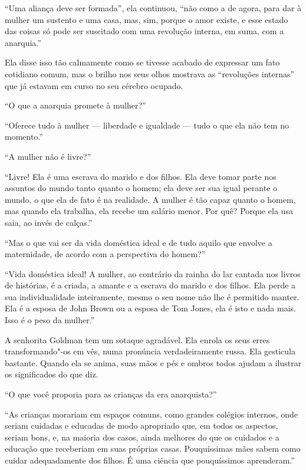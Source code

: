 ``Uma aliança deve ser formada'', ela continuou, ``não como a de agora,
para dar à mulher um sustento e uma casa, mas, sim, porque o amor
existe, e esse estado das coisas só pode ser suscitado com uma revolução
interna, em suma, com a anarquia.''

Ela disse isso tão calmamente como se tivesse acabado de expressar um
fato cotidiano comum, mas o brilho nos seus olhos mostrava as
``revoluções internas'' que já estavam em curso no seu cérebro ocupado.

``O que a anarquia promete à mulher?''

``Oferece tudo à mulher --- liberdade e igualdade --- tudo o que ela não
tem no momento.''

``A mulher não é livre?''

``Livre! Ela é uma escrava do marido e dos filhos. Ela deve tomar parte
nos assuntos do mundo tanto quanto o homem; ela deve ser sua igual
perante o mundo, o que ela de fato é na realidade. A mulher é tão capaz
quanto o homem, mas quando ela trabalha, ela recebe um salário menor.
Por quê? Porque ela usa saia, ao invés de calças.''

``Mas o que vai ser da vida doméstica ideal e de tudo aquilo que envolve
a maternidade, de acordo com a perspectiva do homem?''

``Vida doméstica ideal! A mulher, ao contrário da rainha do lar cantada
nos livros de histórias, é a criada, a amante e a escrava do marido e dos
filhos. Ela perde a sua individualidade inteiramente, mesmo o seu nome
não lhe é permitido manter. Ela é a esposa de John Brown ou a esposa de
Tom Jones, ela é isto e nada mais. Isso é o peso da mulher.'' 

A senhorita Goldman tem um sotaque agradável. Ela enrola os seus erres
transformando"-os em vês, numa pronúncia verdadeiramente russa. Ela
gesticula bastante. Quando ela se anima, suas mãos e pés e ombros todos
ajudam a ilustrar os significados do que diz.

``O que você proporia para as crianças da era anarquista?''

``As crianças morariam em espaços comuns, como grandes colégios
internos, onde seriam cuidadas e educadas de modo apropriado que, em
todos os aspectos, seriam bons, e, na maioria dos casos, ainda
melhores do que os cuidados e a educação que receberiam em suas próprias
casas. Pouquíssimas mães sabem como cuidar adequadamente dos filhos. É
uma ciência que pouquíssimos aprenderam.''

